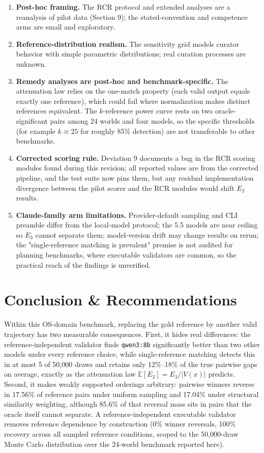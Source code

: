 \documentclass[11pt]{article}
\begin{document}
\begin{enumerate}
\item \textbf{Post-hoc framing.} The RCR protocol and extended analyses are a reanalysis of pilot data (Section 9); the stated-convention and competence arms are small and exploratory.
\item \textbf{Reference-distribution realism.} The sensitivity grid models curator behavior with simple parametric distributions; real curation processes are unknown.
\item \textbf{Remedy analyses are post-hoc and benchmark-specific.} The attenuation law relies on the one-match property (each valid output equals exactly one reference), which could fail where normalization makes distinct references equivalent. The $k$-reference power curve rests on two oracle-significant pairs among 24 worlds and four models, so the specific thresholds (for example $k \approx 25$ for roughly 85\% detection) are not transferable to other benchmarks.
\item \textbf{Corrected scoring rule.} Deviation 9 documents a bug in the RCR scoring modules found during this revision; all reported values are from the corrected pipeline, and the test suite now pins them, but any residual implementation divergence between the pilot scorer and the RCR modules would shift $E_2$ results.
\item \textbf{Claude-family arm limitations.} Provider-default sampling and CLI preamble differ from the local-model protocol; the 5.5 models are near ceiling so $E_3$ cannot separate them; model-version drift may change results on rerun; the "single-reference matching is prevalent" premise is not audited for planning benchmarks, where executable validators are common, so the practical reach of the findings is unverified.
\end{enumerate}
\section{Conclusion \& Recommendations}
Within this OS-domain benchmark, replacing the gold reference by another valid trajectory has two measurable consequences. First, it hides real differences: the reference-independent validator finds \texttt{qwen3:8b} significantly better than two other models under every reference choice, while single-reference matching detects this in at most 5 of 50,000 draws and retains only 12\%--18\% of the true pairwise gaps on average, exactly as the attenuation law $\mathbb{E}[E_2] = E_3/|V(x)|$ predicts. Second, it makes weakly supported orderings arbitrary: pairwise winners reverse in 17.56\% of reference pairs under uniform sampling and 17.04\% under structural similarity weighting, although 85.6\% of that reversal mass sits in pairs that the oracle itself cannot separate. A reference-independent executable validator removes reference dependence by construction (0\% winner reversals, 100\% recovery across all sampled reference conditions, scoped to the 50,000-draw Monte Carlo distribution over the 24-world benchmark reported here).
\end{document}
